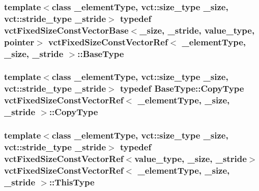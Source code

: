 \subsubsection[{Base\+Type}]{\setlength{\rightskip}{0pt plus 5cm}template$<$class \+\_\+element\+Type, vct\+::size\+\_\+type \+\_\+size, vct\+::stride\+\_\+type \+\_\+stride$>$ typedef {\bf vct\+Fixed\+Size\+Const\+Vector\+Base}$<$\+\_\+size, \+\_\+stride, value\+\_\+type, pointer$>$ {\bf vct\+Fixed\+Size\+Const\+Vector\+Ref}$<$ \+\_\+element\+Type, \+\_\+size, \+\_\+stride $>$\+::{\bf Base\+Type}}\label{classvct_fixed_size_const_vector_ref_a669fc6db8058bda695431756ce54f59d}
\hypertarget{classvct_fixed_size_const_vector_ref_a14ea8a2cf943f5a4f5f9d2def5ce48de}{}
\subsubsection[{Copy\+Type}]{\setlength{\rightskip}{0pt plus 5cm}template$<$class \+\_\+element\+Type, vct\+::size\+\_\+type \+\_\+size, vct\+::stride\+\_\+type \+\_\+stride$>$ typedef {\bf Base\+Type\+::\+Copy\+Type} {\bf vct\+Fixed\+Size\+Const\+Vector\+Ref}$<$ \+\_\+element\+Type, \+\_\+size, \+\_\+stride $>$\+::{\bf Copy\+Type}}\label{classvct_fixed_size_const_vector_ref_a14ea8a2cf943f5a4f5f9d2def5ce48de}
\hypertarget{classvct_fixed_size_const_vector_ref_a21e7349968a7377aaeacacf7803e05e6}{}
\subsubsection[{This\+Type}]{\setlength{\rightskip}{0pt plus 5cm}template$<$class \+\_\+element\+Type, vct\+::size\+\_\+type \+\_\+size, vct\+::stride\+\_\+type \+\_\+stride$>$ typedef {\bf vct\+Fixed\+Size\+Const\+Vector\+Ref}$<$value\+\_\+type, \+\_\+size, \+\_\+stride$>$ {\bf vct\+Fixed\+Size\+Const\+Vector\+Ref}$<$ \+\_\+element\+Type, \+\_\+size, \+\_\+stride $>$\+::{\bf This\+Type}}\label{classvct_fixed_size_const_vector_ref_a21e7349968a7377aaeacacf7803e05e6}
\hypertarget{classvct_fixed_size_const_vector_ref_a3babba555c9429381db7df666b708aca}{}
